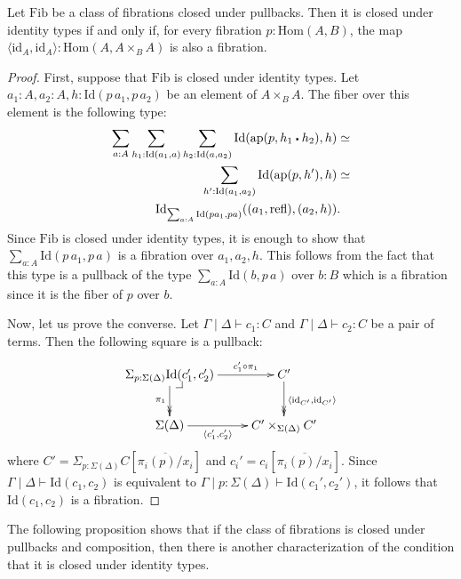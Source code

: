 \documentclass[reqno]{amsart}
\makeatletter
\theoremstyle{definition}
\theoremstyle{remark}
\newcommand{\fs}[1]{\mathrm{#1}}
\newcommand{\Hom}{\fs{Hom}}
\newcommand{\Id}{\fs{Id}}
\newcommand{\refl}{\fs{refl}}
\newcommand{\id}{\fs{id}}
\newcommand{\pmap}{\fs{ap}}
\newcommand{\Fib}{\fs{Fib}}
\numberwithin{figure}{section}
\newcommand{\ct}{%
  \mathchoice{\mathbin{\raisebox{0.25ex}{$\displaystyle\centerdot$}}}%
             {\mathbin{\raisebox{0.25ex}{$\centerdot$}}}%
             {\mathbin{\raisebox{0.25ex}{$\scriptstyle\,\centerdot\,$}}}%
             {\mathbin{\raisebox{0.25ex}{$\scriptscriptstyle\,\centerdot\,$}}}
}
\newcommand{\pb}[1][dr]{\save*!/#1-1.2pc/#1:(-1,1)@^{|-}\restore}
\makeatother
\begin{document}
\begin{prop}[fib-id]
Let $\Fib$ be a class of fibrations closed under pullbacks.
Then it is closed under identity types if and only if, for every fibration $p : \Hom(A,B)$, the map $\langle \id_A, \id_A \rangle : \Hom(A, A \times_B A)$ is also a fibration.
\end{prop}
\begin{proof}
First, suppose that $\Fib$ is closed under identity types.
Let $a_1 : A, a_2 : A, h : \Id(p\,a_1,p\,a_2)$ be an element of $A \times_B A$.
The fiber over this element is the following type:
\begin{align*}
\sum_{a : A} \sum_{h_1 : \Id(a_1,a)} \sum_{h_2 : \Id(a,a_2)} \Id(\pmap(p, h_1 \ct h_2), h) & \simeq \\
\sum_{h' : \Id(a_1,a_2)} \Id(\pmap(p,h'),h) & \simeq \\
\Id_{\sum_{a : A} \Id(p a_1, p a)}((a_1,\refl), (a_2,h)) & .
\end{align*}
Since $\Fib$ is closed under identity types, it is enough to show that $\sum_{a : A} \Id(p\,a_1,p\,a)$ is a fibration over $a_1,a_2,h$.
This follows from the fact that this type is a pullback of the type $\sum_{a : A} \Id(b,p\,a)$ over $b : B$ which is a fibration since it is the fiber of $p$ over $b$.

Now, let us prove the converse.
Let $\Gamma \mid \Delta \vdash c_1 : C$ and $\Gamma \mid \Delta \vdash c_2 : C$ be a pair of terms.
Then the following square is a pullback:
\[ \xymatrix{ \Sigma_{p : \Sigma(\Delta)} \Id(c_1',c_2') \ar[r]^-{c_1' \circ \pi_1} \ar@{->>}[d]_{\pi_1} \pb    & C' \ar@{->>}[d]^{\langle \id_{C'}, \id_{C'} \rangle} \\
              \Sigma(\Delta) \ar[r]_-{\langle c_1', c_2' \rangle}                                               & C' \times_{\Sigma(\Delta)} C'
            } \]
where $C' = \Sigma_{p : \Sigma(\Delta)} C[\overline{\pi_i(p)/x_i}]$ and $c_i' = c_i[\overline{\pi_i(p)/x_i}]$.
Since $\Gamma \mid \Delta \vdash \Id(c_1,c_2)$ is equivalent to $\Gamma \mid p : \Sigma(\Delta) \vdash \Id(c_1',c_2')$, it follows that $\Id(c_1,c_2)$ is a fibration.
\end{proof}

The following proposition shows that if the class of fibrations is closed under pullbacks and composition, then there is another characterization of the condition that it is closed under identity types.
\end{document}
